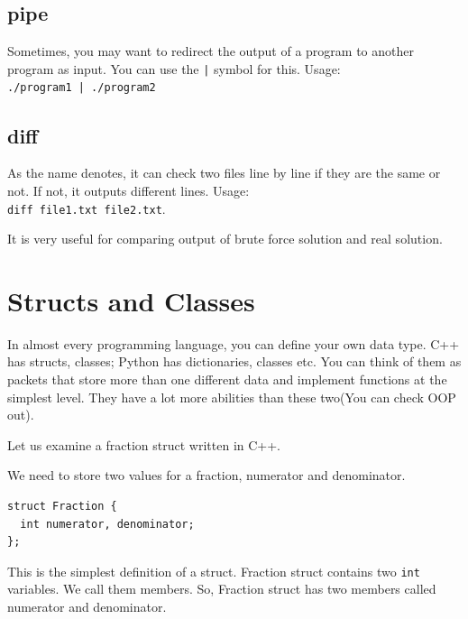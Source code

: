 \documentclass[12pt]{article}
\begin{document}
\subsection{pipe}
Sometimes, you may want to redirect the output of a program to another program as input. You can use the \texttt{|} symbol for this. Usage:\\
\texttt{./program1 | ./program2}

\subsection{diff}
As the name denotes, it can check two files line by line if they are the same or not. If not, it outputs different lines. Usage:\\
\texttt{diff file1.txt file2.txt}.

It is very useful for comparing output of brute force solution and real solution.

\section{Structs and Classes}
In almost every programming language, you can define your own data type. C++ has structs, classes; Python has dictionaries, classes etc. You can think of them as packets that store more than one different data and implement functions at the simplest level. They have a lot more abilities than these two(You can check OOP out).

Let us examine a fraction struct written in C++.

We need to store two values for a fraction, numerator and denominator.

\begin{verbatim}
struct Fraction {
  int numerator, denominator;
};
\end{verbatim}

This is the simplest definition of a struct. Fraction struct contains two \lstinline{int} variables. We call them members. So, Fraction struct has two members called numerator and denominator. 
\end{document}
